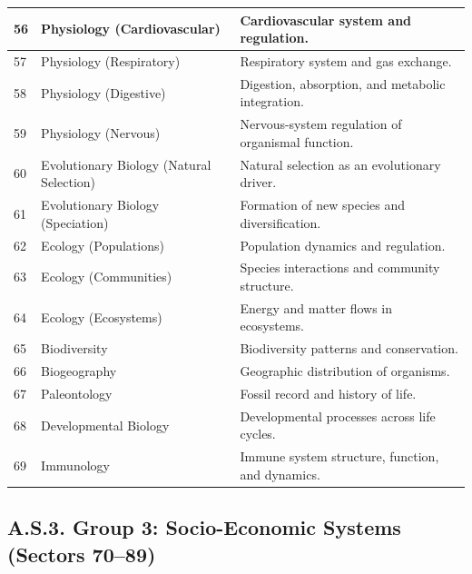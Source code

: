 \documentclass[13pt,a4paper]{article}
\begin{document}
\begin{longtable}{|p{0.9cm}|p{6.0cm}|p{8.6cm}|}
		\hline
		56 & Physiology (Cardiovascular) & Cardiovascular system and regulation. \\
		\hline
		57 & Physiology (Respiratory) & Respiratory system and gas exchange. \\
		\hline
		58 & Physiology (Digestive) & Digestion, absorption, and metabolic integration. \\
		\hline
		59 & Physiology (Nervous) & Nervous-system regulation of organismal function. \\
		\hline
		60 & Evolutionary Biology (Natural Selection) & Natural selection as an evolutionary driver. \\
		\hline
		61 & Evolutionary Biology (Speciation) & Formation of new species and diversification. \\
		\hline
		62 & Ecology (Populations) & Population dynamics and regulation. \\
		\hline
		63 & Ecology (Communities) & Species interactions and community structure. \\
		\hline
		64 & Ecology (Ecosystems) & Energy and matter flows in ecosystems. \\
		\hline
		65 & Biodiversity & Biodiversity patterns and conservation. \\
		\hline
		66 & Biogeography & Geographic distribution of organisms. \\
		\hline
		67 & Paleontology & Fossil record and history of life. \\
		\hline
		68 & Developmental Biology & Developmental processes across life cycles. \\
		\hline
		69 & Immunology & Immune system structure, function, and dynamics. \\
		\hline
	\end{longtable}
	
	\subsection*{A.S.3. Group 3: Socio-Economic Systems (Sectors 70--89)}
	
\end{document}

